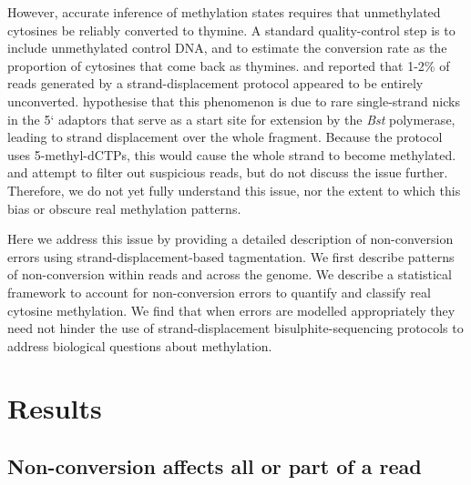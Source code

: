 \documentclass[12pt,longbibliography]{article}
\begin{document}
However, accurate inference of methylation states requires that unmethylated cytosines be reliably converted to thymine.
A standard quality-control step is to include unmethylated control DNA, and to estimate the conversion rate as the proportion of cytosines that come back as thymines.
\textcite{lu2015improved} and \textcite{suzuki2018whole} reported that 1-2\% of reads generated by a strand-displacement protocol appeared to be entirely unconverted.
\textcite{lu2015improved} hypothesise that this phenomenon is due to rare single-strand nicks in the 5` adaptors that serve as a start site for extension by the \textit{Bst} polymerase, leading to strand displacement over the whole fragment.
Because the protocol uses 5-methyl-dCTPs, this would cause the whole strand to become methylated.
\textcite{lu2015improved} and \textcite{suzuki2018whole} attempt to filter out suspicious reads, but do not discuss the issue further.
Therefore, we do not yet fully understand this issue, nor the extent to which this bias or obscure real methylation patterns.

Here we address this issue by providing a detailed description of non-conversion errors using strand-displacement-based tagmentation.
We first describe patterns of non-conversion within reads and across the genome.
We describe a statistical framework to account for non-conversion errors to quantify and classify real cytosine methylation.
We find that when errors are modelled appropriately they need not hinder the use of strand-displacement bisulphite-sequencing protocols to address biological questions about methylation.

\section{Results}

\subsection{Non-conversion affects all or part of a read}
\end{document}
